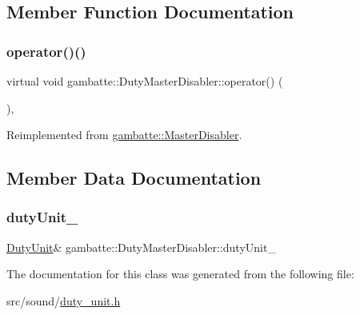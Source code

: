 \subsection{Member Function Documentation}
\mbox{\label{classgambatte_1_1DutyMasterDisabler_a21f513f0b20eae19255a473668a099f6}} 
\subsubsection{\texorpdfstring{operator()()}{operator()()}}
{\footnotesize\ttfamily virtual void gambatte\+::\+Duty\+Master\+Disabler\+::operator() (\begin{DoxyParamCaption}{ }\end{DoxyParamCaption})\hspace{0.3cm}{\ttfamily [inline]}, {\ttfamily [virtual]}}



Reimplemented from \hyperlink{classgambatte_1_1MasterDisabler_a6b69f64af3e8112eac3767a74ee0e322}{gambatte\+::\+Master\+Disabler}.



\subsection{Member Data Documentation}
\mbox{\label{classgambatte_1_1DutyMasterDisabler_a972464d15d13fd132dd1a9266f39bc13}} 
\subsubsection{\texorpdfstring{duty\+Unit\+\_\+}{dutyUnit\_}}
{\footnotesize\ttfamily \hyperlink{classgambatte_1_1DutyUnit}{Duty\+Unit}\& gambatte\+::\+Duty\+Master\+Disabler\+::duty\+Unit\+\_\+\hspace{0.3cm}{\ttfamily [private]}}



The documentation for this class was generated from the following file\+:\begin{DoxyCompactItemize}
\item 
src/sound/\hyperlink{duty__unit_8h}{duty\+\_\+unit.\+h}\end{DoxyCompactItemize}

